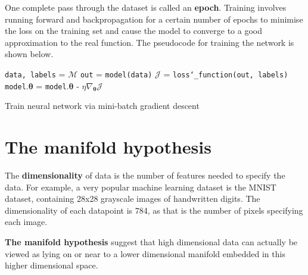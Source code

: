 \documentclass[12pt,a4paper,twoside,openright]{report}
\renewcommand{\vec}[1]{\bm{#1}}
\begin{document}
One complete pass through the dataset is called an \textbf{epoch}. Training involves running forward and backpropagation for a certain number of epochs to minimise the loss
on the training set and cause the model to converge to a good approximation to the real function. The pseudocode for training the network is shown below.
\begin{algorithm}
  \begin{algorithmic}[1]
    \State \texttt{data, labels} = $\mathcal{M}$
    \State \texttt{out} = \texttt{model(data)}
    \State $\mathcal{J}$ = \texttt{loss\char`_function(out, labels)}
    \State \texttt{model}.$\vec{\theta}$ = \texttt{model}.$\vec{\theta}$ - $\eta \nabla_{\vec{\theta}} \mathcal{J}$ 
    \EndFor
    \EndFor
    \EndProcedure
  \end{algorithmic}
  \caption{Train neural network via mini-batch gradient descent} 
  \label{alg:train}
\end{algorithm}

\section{The manifold hypothesis}

The \textbf{dimensionality} of data is the number of features needed to specify the data. For example, a very popular machine learning dataset
is the MNIST dataset, containing 28x28 grayscale images of handwritten digits. The dimensionality of each datapoint is 784, as that is the
number of pixels specifying each image.

\textbf{The manifold hypothesis} suggest that high dimensional data can actually be viewed as lying on or near to a
lower dimensional manifold embedded in this higher dimensional space.
\end{document}
